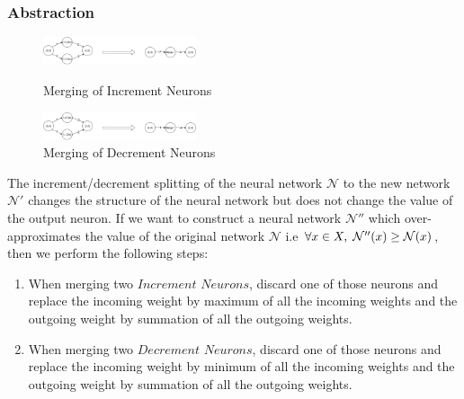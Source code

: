 


\subsubsection{Abstraction}

\begin{figure}[H]
    \centering
    \includegraphics[width=0.4\textwidth]{diagrams/Abstraction_part1.pdf}
    \caption{Merging of Increment Neurons}
    \label{Figure: Merge1}
    \includegraphics[width=0.4\textwidth]{diagrams/Abstraction_part2.pdf}
    \caption{Merging of Decrement Neurons}
    \label{Figure: Merge2}

\end{figure} 
The increment/decrement splitting of the neural network $\mathcal{N}$ to the new network $\mathcal{N'}$ changes the structure of the neural network but does not change the value of the output neuron. If we want to construct a neural network $\mathcal{N}''$ which over-approximates the value of the original network $\mathcal{N}$ i.e $\forall x \in X, \hspace{1mm} \mathcal{N''}(x) \geq \mathcal{N}(x)$, then we perform the following steps:
\begin{enumerate}
    \item When merging two $\textit{Increment Neurons}$, discard one of those neurons and replace the incoming weight by maximum of all the incoming weights and the outgoing weight by summation of all the outgoing weights. 
    \item When merging two $\textit{Decrement Neurons}$, discard one of those neurons and replace the incoming weight by minimum of all the incoming weights and the outgoing weight by summation of all the outgoing weights. 
\end{enumerate}



